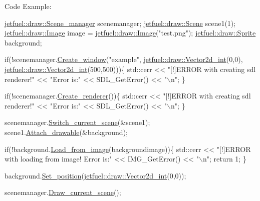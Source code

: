 Code Example\+: 
\begin{DoxyCode}
\hyperlink{classjetfuel_1_1draw_1_1Scene__manager}{jetfuel::draw::Scene\_manager} scenemanager;
\hyperlink{classjetfuel_1_1draw_1_1Scene}{jetfuel::draw::Scene} scene1(1);
\hyperlink{classjetfuel_1_1draw_1_1Image}{jetfuel::draw::Image} image = \hyperlink{classjetfuel_1_1draw_1_1Image}{jetfuel::draw::Image}(\textcolor{stringliteral}{"test.png"});
\hyperlink{classjetfuel_1_1draw_1_1Sprite}{jetfuel::draw::Sprite} background;

\textcolor{keywordflow}{if}(!scenemanager.\hyperlink{classjetfuel_1_1draw_1_1Scene__manager_a5113e9062c272a22d383ba872417ba31}{Create\_window}(\textcolor{stringliteral}{"example"},
                         \hyperlink{classjetfuel_1_1draw_1_1Vector2d}{jetfuel::draw::Vector2d\_int}(0,0),
                         \hyperlink{classjetfuel_1_1draw_1_1Vector2d}{jetfuel::draw::Vector2d\_int}(500,500)))\{
   std::cerr << \textcolor{stringliteral}{"[!]ERROR with creating sdl renderer!"} <<
    \textcolor{stringliteral}{"Error is:"} << SDL\_GetError() << \textcolor{stringliteral}{"\(\backslash\)n"};
\}

\textcolor{keywordflow}{if}(!scenemanager.\hyperlink{classjetfuel_1_1draw_1_1Scene__manager_afafecd926ce5e4b2543a6d583a7d24b6}{Create\_renderer}())\{
     std::cerr << \textcolor{stringliteral}{"[!]ERROR with creating sdl renderer!"} <<
    \textcolor{stringliteral}{"Error is:"} << SDL\_GetError() << \textcolor{stringliteral}{"\(\backslash\)n"};
\}

scenemanager.\hyperlink{classjetfuel_1_1draw_1_1Scene__manager_a770c163b88ba8427539ee182315ea989}{Switch\_current\_scene}(&scene1);
scene1.\hyperlink{classjetfuel_1_1draw_1_1Scene_aea4b4c4ae25c30d661be4c52787e0ea3}{Attach\_drawable}(&background);

\textcolor{keywordflow}{if}(!background.\hyperlink{classjetfuel_1_1draw_1_1Sprite_a370d0b3b2770348ae57ae5156c59a0ca}{Load\_from\_image}(backgroundimage))\{
    std::cerr << \textcolor{stringliteral}{"[!]ERROR with loading from image! Error is:"} << IMG\_GetError() << \textcolor{stringliteral}{"\(\backslash\)n"};
    \textcolor{keywordflow}{return} 1;
\}

background.\hyperlink{classjetfuel_1_1draw_1_1Drawable_afdd035afe40c706459a6c9df813bcce6}{Set\_position}(\hyperlink{classjetfuel_1_1draw_1_1Vector2d}{jetfuel::draw::Vector2d\_int}(0,0));

scenemanager.\hyperlink{classjetfuel_1_1draw_1_1Scene__manager_a8af9a3abfd5121b1b8556342de435773}{Draw\_current\_scene}();
\end{DoxyCode}
 

